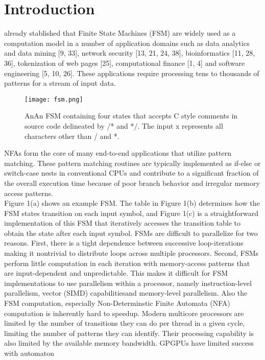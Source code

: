 \section{\textbf{Introduction}}
 already stablished that  Finite State Machines (FSM) are widely used as a computation
model in a number of application domains such as data analytics
and data mining [9, 33], network security [13, 21, 24, 38], bioinformatics [11, 28, 36], tokenization of web pages [25], computational
finance [1, 4] and software engineering [5, 10, 26]. These applications require processing tens to thousands of patterns for a stream of
input data.\\
\begin{figure}[!h]
    \texttt{[image: fsm.png]}
    \caption{AnAn FSM containing four states that accepts C style comments in source code delineated by /* and */. The
    input x represents all characters other than / and *.}
    \centering
\end{figure}
NFAs form the core of many end-to-end applications that utilize pattern matching.
 These pattern matching routines are typically
implemented as if-else or switch-case nests in conventional CPUs
and contribute to a significant fraction of the overall execution time
because of poor branch behavior and irregular memory access patterns.\\
Figure 1(a) shows an example FSM.
The table in Figure 1(b) determines how the FSM states transition
 on each input symbol, and Figure 1(c) is a straightforward implementation of this FSM that iteratively accesses
the transition table to obtain the state after each input symbol.
FSMs are difficult to parallelize for two reasons. First,
there is a tight dependence between successive loop-iterations
making it nontrivial to distribute loops across multiple
processors. Second, FSMs perform little computation in
each iteration with memory-access patterns that are input-dependent and unpredictable.
This makes it difficult for
FSM implementations to use parallelism within a processor,
namely instruction-level parallelism, vector (SIMD) capabilitiesand memory-level parallelism.
Also the FSM computation, especially Non-Determinstic Finite Automata
(NFA) computation is inherently hard to speedup. Modern multicore
 processors are limited by the number of transitions they can do
per thread in a given cycle, limiting the number of patterns they can
identify. Their processing capability is also limited by the available
memory bandwidth. GPGPUs have limited success with automaton

